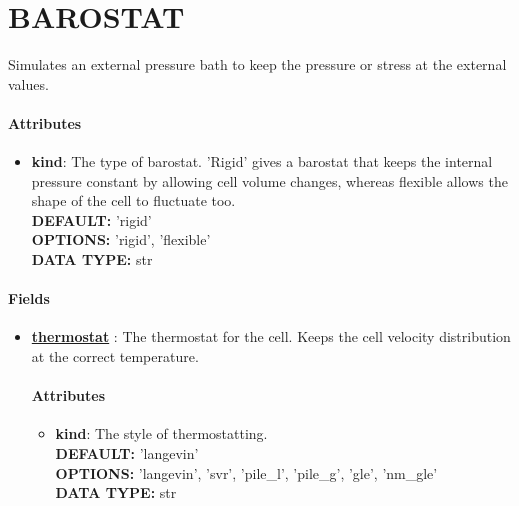 \section{BAROSTAT}
\label{BAROSTAT}
Simulates an external pressure bath to keep the pressure or stress at the external values.
\paragraph{Attributes}
 \begin{itemize}
\item {\bf kind}:
 The type of barostat. 'Rigid' gives a barostat that keeps the internal pressure constant by allowing cell volume changes, whereas flexible allows the shape of the cell to fluctuate too.
{\\ \bf DEFAULT: }'rigid'
{\\ \bf OPTIONS: }'rigid', 'flexible'
{\\ \bf DATA TYPE: }str
\end{itemize}
 
\paragraph{Fields}
 \begin{itemize}
\item {\bf \hyperref[THERMOSTATS]{thermostat} }:
 The thermostat for the cell. Keeps the cell velocity distribution at the correct temperature.
\paragraph{Attributes}
 \begin{itemize}
\item {\bf kind}:
 The style of thermostatting.
{\\ \bf DEFAULT: }'langevin'
{\\ \bf OPTIONS: }'langevin', 'svr', 'pile\_l', 'pile\_g', 'gle', 'nm\_gle'
{\\ \bf DATA TYPE: }str
\end{itemize}
 
\end{itemize}
 
